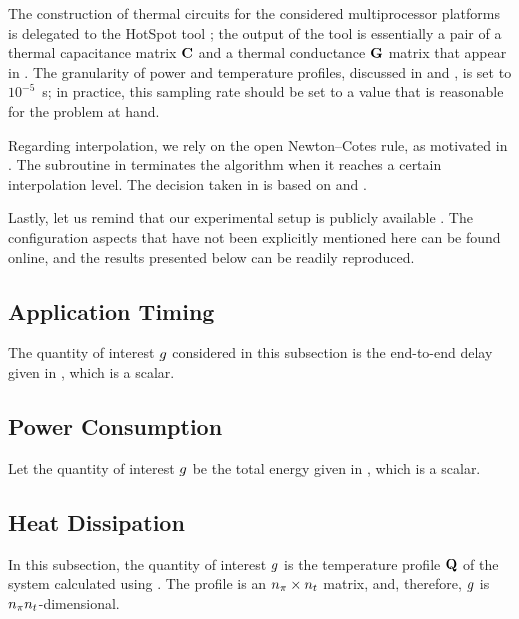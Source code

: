 The construction of thermal  circuits for the considered multiprocessor
platforms is delegated to the HotSpot tool \cite{skadron2004}; the output of the
tool is essentially a pair of a thermal capacitance matrix $\mathbf{C}$ and a thermal
conductance $\mathbf{G}$ matrix that appear in . The granularity
of power and temperature profiles, discussed in  and
, is set to $10^{-5}$~s; in practice, this sampling rate
should be set to a value that is reasonable for the problem at hand.

Regarding interpolation, we rely on the open Newton--Cotes rule, as motivated in
. The  subroutine in
 terminates the algorithm when it reaches a certain
interpolation level. The decision taken in  is based on
 and .

Lastly, let us remind that our experimental setup is publicly available
\cite{sources}. The configuration aspects that have not been explicitly
mentioned here can be found online, and the results presented below can be
readily reproduced.

\subsection{Application Timing}
The quantity of interest $g$ considered in this subsection is the end-to-end
delay given in , which is a scalar.

\subsection{Power Consumption}
Let the quantity of interest $g$ be the total energy given in
, which is a scalar.

\subsection{Heat Dissipation}
In this subsection, the quantity of interest $g$ is the temperature profile
$\mathbf{Q}$ of the system calculated using . The profile is an
${n_\pi} \times {n_t}$ matrix, and, therefore, $g$ is ${n_\pi} {n_t}$-dimensional.
